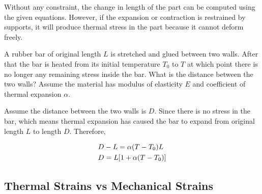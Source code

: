 \documentclass[
10pt,
a4paper,
openany,
svgnames,
]{kaobook} %
\begin{document}
Without any constraint, the change in length of the part can be computed using the given equations. However, if the expansion or contraction is restrained by supports, it will produce thermal stress in the part because it cannot deform freely.

\begin{example}
  
  A rubber bar of original length $L$ is stretched and glued between two walls. After that the bar is heated from its initial temperature $T_0$ to $T$ at which point there is no longer any remaining stress inside the bar. What is the distance between the two walls? Assume the material has modulus of elasticity $E$ and coefficient of thermal expansion $\alpha$.
  
  \begin{figure}[H]
    \centering
  \end{figure}
  
\end{example}
\begin{solution}
  Assume the distance between the two walls is $D$. Since there is no stress in the bar, which means thermal expansion has caused the bar to expand from original length $L$ to length $D$. Therefore,
  
\[\begin{gathered}
  D - L = \alpha (T - {T_0})L \hfill \\
  D = L[1 + \alpha (T - {T_0})] \hfill \\ 
\end{gathered}\]
	
\end{solution}

\subsection{Thermal Strains vs Mechanical Strains}
\end{document}
